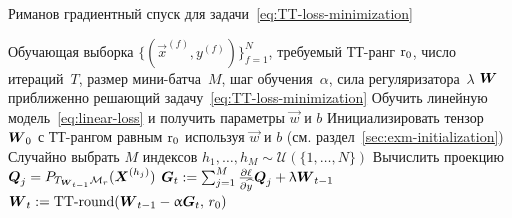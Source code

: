 \begin{algorithm}[t]
   \caption{Риманов градиентный спуск для задачи~\eqref{eq:TT-loss-minimization}}
   \label{alg:rimeannian-optimization}
\begin{algorithmic}
   \REQUIRE Обучающая выборка $\{(\vec{x}^{(f)}, y^{(f)})\}_{f=1}^N$, требуемый ТТ-ранг $\operatorname{r}_0$, число итераций~$T$, размер мини-батча~$M$, шаг обучения~$\alpha$, сила регуляризатора~$\lambda$
   \ENSURE $\boldsymbol{W}$ приближенно решающий задачу~\eqref{eq:TT-loss-minimization}
   \STATE Обучить линейную модель~\eqref{eq:linear-loss} и получить параметры $\vec{w}$ и $b$
   \STATE Инициализировать тензор $\boldsymbol{W}_0$ с ТТ-рангом равным $\operatorname{r}_0$ используя $\vec{w}$ и $b$  (см. раздел~\ref{sec:exm-initialization})
        \STATE Случайно выбрать $M$ индексов $h_1, \ldots, h_M \sim \mathcal{U}(\{1, \ldots, N\})$
	        \STATE Вычислить проекцию $\boldsymbol{Q}_j = P_{T_{\boldsymbol{W}_{t-1}} \mathcal{M}_r} (\boldsymbol{X}^{(h_j)})$
        \ENDFOR
        \STATE $\boldsymbol{G}_t := \sum_{j=1}^M \frac{\partial \ell}{\partial \widehat{y}} \boldsymbol{Q}_j  + \uplambda \boldsymbol{W}_{t-1}$
        \STATE $\boldsymbol{W}_{t} := \operatorname{TT-round}(\boldsymbol{W}_{t-1} - \upalpha \boldsymbol{G}_t, \,r_0)$
   \ENDFOR
\end{algorithmic}
\end{algorithm}


